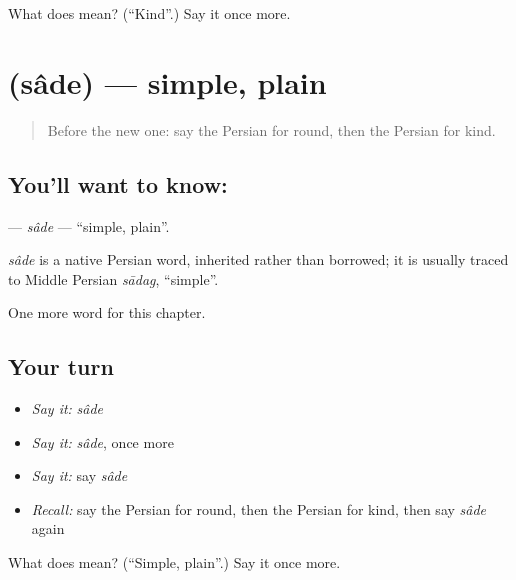 \begin{tcolorbox}[breakable,colback=teal!4,colframe=teal!35!black,title={Before you move on}]
What does  mean? (\textquotedblleft{}Kind\textquotedblright{}.) Say it once more.
\end{tcolorbox}
\section[\texorpdfstring{\fa{ساده} (sâde)}{ساده (sâde)}]{ (sâde) — simple, plain}

\label{lesson:FA-C128-sade}



\begin{quote}
Before the new one: say the Persian for round, then the Persian for kind.
\end{quote}

\subsection*{You'll want to know: }
\textbf{} — \emph{sâde} — \textquotedblleft{}simple, plain\textquotedblright{}.

\begin{cousinweb}
\emph{sâde} is a native Persian word, inherited rather than borrowed; it is usually traced to Middle Persian \emph{sādag}, \textquotedblleft{}simple\textquotedblright{}.
\end{cousinweb}

\begin{grammarlens}[title={What you've built}]
One more word for this chapter.
\end{grammarlens}

\subsection*{Your turn}
\begin{itemize}
\raggedright
  \item \emph{Say it:} \emph{sâde}
  \item \emph{Say it:} \emph{sâde}, once more
  \item \emph{Say it:} say \emph{sâde}
  \item \emph{Recall:} say the Persian for round, then the Persian for kind, then say \emph{sâde} again
\end{itemize}

\begin{tcolorbox}[breakable,colback=teal!4,colframe=teal!35!black,title={Before you move on}]
What does  mean? (\textquotedblleft{}Simple, plain\textquotedblright{}.) Say it once more.
\end{tcolorbox}
